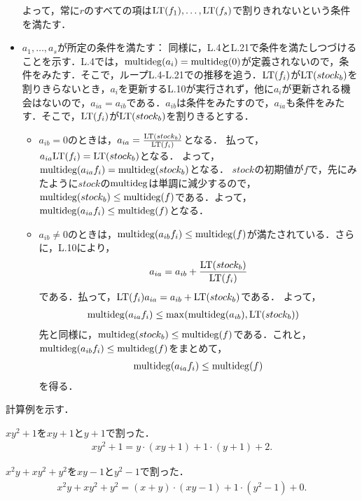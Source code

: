 \documentclass[9pt]{ltjsarticle}
\begin{document}
\begin{myproof}
\begin{itemize}
よって，常に$r$のすべての項は${\rm LT}(f_1),\dots,{\rm LT}(f_s)$で割りきれないという条件を満たす．
  \item $a_1,\dots,a_s$が所定の条件を満たす：
同様に，L.4とL.21で条件を満たしつづけることを示す．L.4では，$\mathrm{multideg}(a_i)=\mathrm{multideg}(0)$が定義されないので，条件をみたす．そこで，ループL.4-L.21での推移を追う．${\rm LT}(f_i)$が${\rm LT}(stock_b)$を割りきらないとき，$a_i$を更新するL.10が実行されず，他に$a_i$が更新される機会はないので，$a_{ia}=a_{ib}$である．$a_{ib}$は条件をみたすので，$a_{ia}$も条件をみたす．そこで，${\rm LT}(f_i)$が${\rm LT}(stock_b)$を割りきるとする．
\begin{itemize}
 \item
$a_{ib}=0$のときは，$a_{ia}=\frac{{\rm LT}(stock_b)}{{\rm LT}(f_i)}$となる．
払って，$a_{ia}{\rm LT}(f_i) = {\rm LT}(stock_b)$となる．
よって，$\mathrm{multideg}(a_{ia} f_i)=\mathrm{multideg}(stock_b)$となる．
$stock$の初期値が$f$で，先にみたように$stock$の$\mathrm{multideg}$は単調に減少するので，
$\mathrm{multideg}(stock_b) \le \mathrm{multideg}(f)$である．よって，$\mathrm{multideg}(a_{ia}f_i) \le \mathrm{multideg}(f)$となる．
 \item $a_{ib}\neq 0$のときは，$\mathrm{multideg}(a_{ib}f_i)\le \mathrm{multideg}(f)$が満たされている．さらに，L.10により，
\begin{align}
 a_{ia} = a_{ib} + \frac{{\rm LT}(stock_b)}{{\rm LT}(f_i)}
\end{align}
である．払って，${\rm LT}(f_i)a_{ia} = a_{ib} + {\rm LT}(stock_b)$である．
よって，
\begin{align}
 \mathrm{multideg}(a_{ia} f_i)
&\le \max(\mathrm{multideg}(a_{ib}),{\rm LT}(stock_b))
\end{align}
先と同様に，$\mathrm{multideg}(stock_b)\le \mathrm{multideg}(f)$である．これと，$\mathrm{multideg}(a_{ib}f_i)\le \mathrm{multideg}(f)$をまとめて，
\begin{align}
 \mathrm{multideg}(a_{ia}f_i) \le \mathrm{multideg}(f)
\end{align}
を得る．
\end{itemize}
 \end{itemize}
\end{myproof}

計算例を示す．



$xy^2+1$を$xy+1$と$y+1$で割った．
\begin{align}
 xy^2 +1 = y\cdot (xy+1) + 1\cdot (y+1) + 2.
\end{align}


$x^2y+xy^2 + y^2$を$xy-1$と$y^2-1$で割った．
\begin{align}
 x^2y + xy^2 + y^2 = (x+y)\cdot (xy-1) + 1\cdot (y^2-1) + 0.
\end{align}
\end{document}
